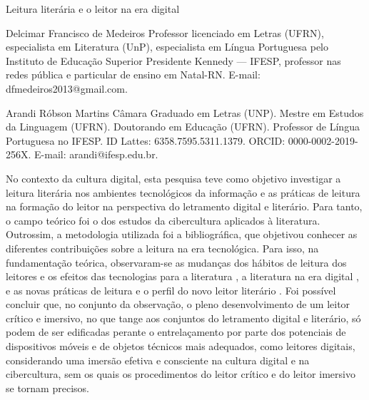 \begin{refsection}
    \renewcommand{\thefigure}{\arabic{figure}}
    
    \chapterOneLine
    {Leitura literária e o leitor na era digital}
    \label{chap:leitura}
    
    \articleAuthor
    {Delcimar Francisco de Medeiros}
    {Professor licenciado em Letras (UFRN), especialista em Literatura (UnP), especialista em Língua Portuguesa pelo Instituto de Educação Superior Presidente Kennedy --- IFESP, professor nas redes pública e particular de ensino em Natal-RN. E-mail: dfmedeiros2013@gmail.com. }

    \articleAuthor
    {Arandi Róbson Martins Câmara }
    {Graduado em Letras (UNP). Mestre em Estudos da Linguagem (UFRN). Doutorando em Educação (UFRN). Professor de Língua Portuguesa no IFESP. ID Lattes: 6358.7595.5311.1379. ORCID: 0000-0002-2019-256X. E-mail: arandi@ifesp.edu.br.}
    
    \begin{galoResumo}
        No contexto da cultura digital, esta pesquisa teve como objetivo investigar a leitura literária nos ambientes tecnológicos da informação e as práticas de leitura na formação do leitor na perspectiva do letramento digital e literário. Para tanto, o campo teórico foi o dos estudos da cibercultura aplicados à literatura. Outrossim, a metodologia utilizada foi a bibliográfica, que objetivou conhecer as diferentes contribuições sobre a leitura na era tecnológica. Para isso, na fundamentação teórica, observaram-se as mudanças dos hábitos de leitura dos leitores e os efeitos das tecnologias para a literatura \cite{Ong1996Oralidad, Levy1999Cibercultura, Marcuschi2001Hipertexto}, a literatura na era digital \cite{Xavier2009Era, Almeida2005Letramento}, e as novas práticas de leitura e o perfil do novo leitor literário \cite{Prensky2001Nativos, Santaella2004Navegar}. Foi possível concluir que, no conjunto da observação, o pleno desenvolvimento de um leitor crítico e imersivo, no que tange aos conjuntos do letramento digital e literário, só podem de ser edificadas perante o entrelaçamento por parte dos potenciais de dispositivos móveis e de objetos técnicos mais adequados, como leitores digitais, considerando uma imersão efetiva e consciente na cultura digital e na cibercultura, sem os quais os procedimentos do leitor crítico e do leitor imersivo se tornam precisos. 
    \end{galoResumo}
    

\end{refsection}
